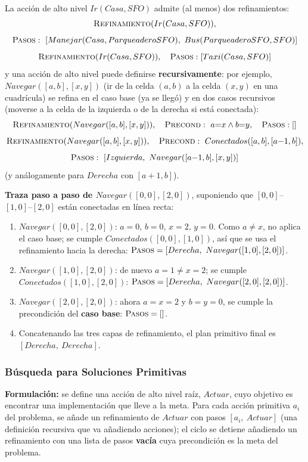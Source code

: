 \begin{example}
La acción de alto nivel $Ir(Casa,SFO)$ admite (al menos) dos refinamientos:
\[
    \textsc{Refinamiento}(Ir(Casa,SFO)),
\]
\[
    \textsc{Pasos}:\ [Manejar(Casa,ParqueaderoSFO),\ Bus(ParqueaderoSFO,SFO)]
\]
\[
    \textsc{Refinamiento}(Ir(Casa,SFO)),\quad \textsc{Pasos}: [Taxi(Casa,SFO)]
\]
y una acción de alto nivel puede definirse \textbf{recursivamente}: por ejemplo, $Navegar([a,b],
[x,y])$ (ir de la celda $(a,b)$ a la celda $(x,y)$ en una cuadrícula) se refina en el caso base
(ya se llegó) y en dos casos recursivos (moverse a la celda de la izquierda o de la derecha si está
conectada):
\[
    \textsc{Refinamiento}(Navegar([a,b],[x,y])),\quad \textsc{Precond}:\ a{=}x\land b{=}y,\quad
    \textsc{Pasos}: []
\]
\[
    \textsc{Refinamiento}(Navegar([a,b],[x,y])),\quad \textsc{Precond}:\ Conectados([a,b],[a{-}1,b]),
\]
\[
    \textsc{Pasos}:\ [Izquierda,\ Navegar([a{-}1,b],[x,y])]
\]
(y análogamente para $Derecha$ con $[a{+}1,b]$).

\textbf{Traza paso a paso de $Navegar([0,0],[2,0])$}, suponiendo que $[0,0]$--$[1,0]$--$[2,0]$ están
conectadas en línea recta:
\begin{enumerate}
    \item $Navegar([0,0],[2,0])$: $a{=}0,\,b{=}0,\,x{=}2,\,y{=}0$. Como $a\neq x$, no aplica el
    caso base; se cumple $Conectados([0,0],[1,0])$, así que se usa el refinamiento hacia la derecha:
    $\textsc{Pasos} = [Derecha,\ Navegar([1,0],[2,0])]$.
    \item $Navegar([1,0],[2,0])$: de nuevo $a{=}1\neq x{=}2$; se cumple $Conectados([1,0],[2,0])$:
    $\textsc{Pasos} = [Derecha,\ Navegar([2,0],[2,0])]$.
    \item $Navegar([2,0],[2,0])$: ahora $a{=}x{=}2$ y $b{=}y{=}0$, se cumple la precondición del
    \textbf{caso base}: $\textsc{Pasos} = []$.
    \item Concatenando las tres capas de refinamiento, el plan primitivo final es
    $[Derecha,\ Derecha]$.
\end{enumerate}
\end{example}

\subsubsection{Búsqueda para Soluciones Primitivas}

\textbf{Formulación:} se define una acción de alto nivel raíz, $Actuar$, cuyo objetivo es encontrar
una implementación que lleve a la meta. Para cada acción primitiva $a_i$ del problema, se añade un
refinamiento de $Actuar$ con pasos $[a_i,\ Actuar]$ (una definición recursiva que va añadiendo
acciones); el ciclo se detiene añadiendo un refinamiento con una lista de pasos \textbf{vacía} cuya
precondición es la meta del problema.

